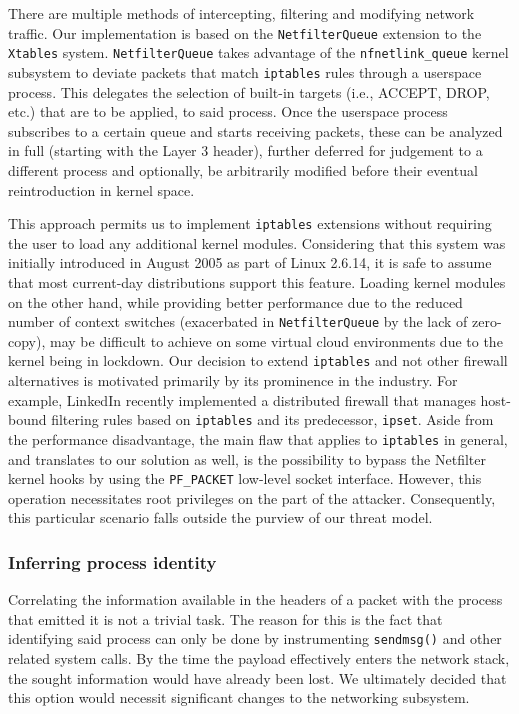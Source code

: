 There are multiple methods of intercepting, filtering and modifying network traffic. Our implementation is based on the \texttt{NetfilterQueue} extension to the \texttt{Xtables} system. \texttt{NetfilterQueue} takes advantage of the \texttt{nfnetlink\_queue} kernel subsystem to deviate packets that match \texttt{iptables} rules through a userspace process. This delegates the selection of built-in targets (i.e., ACCEPT, DROP, etc.) that are to be applied, to said process. Once the userspace process subscribes to a certain queue and starts receiving packets, these can be analyzed in full (starting with the Layer 3 header), further deferred for judgement to a different process and optionally, be arbitrarily modified before their eventual reintroduction in kernel space.

This approach permits us to implement \texttt{iptables} extensions without requiring the user to load any additional kernel modules. Considering that this system was initially introduced in August 2005 as part of Linux 2.6.14, it is safe to assume that most current-day distributions support this feature. Loading kernel modules on the other hand, while providing better performance due to the reduced number of context switches (exacerbated in \texttt{NetfilterQueue} by the lack of zero-copy), may be difficult to achieve on some virtual cloud environments due to the kernel being in lockdown. Our decision to extend \texttt{iptables} and not other firewall alternatives is motivated primarily by its prominence in the industry. For example, LinkedIn recently implemented a distributed firewall \cite{linkedin_dfw} that manages host-bound filtering rules based on \texttt{iptables} and its predecessor, \texttt{ipset}. Aside from the performance disadvantage, the main flaw that applies to \texttt{iptables} in general, and translates to our solution as well, is the possibility to bypass the Netfilter kernel hooks by using the \texttt{PF\_PACKET} low-level socket interface. However, this operation necessitates root privileges on the part of the attacker. Consequently, this particular scenario falls outside the purview of our threat model.


\subsubsection{Inferring process identity}

Correlating the information available in the headers of a packet with the process that emitted it is not a trivial task. The reason for this is the fact that identifying said process can only be done by instrumenting \texttt{sendmsg()} and other related system calls. By the time the payload effectively enters the network stack, the sought information would have already been lost. We ultimately decided that this option would necessit significant changes to the networking subsystem.

